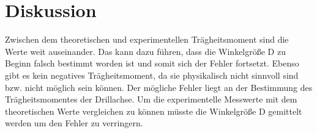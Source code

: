 \section{Diskussion}
Zwischen dem theoretischen und experimentellen Trägheitsmoment sind die Werte weit auseinander. Das kann dazu führen, dass die Winkelgröße D zu Beginn falsch bestimmt worden ist und somit sich der Fehler fortsetzt.
Ebenso gibt es kein negatives Trägheitsmoment, da sie physikalisch nicht sinnvoll sind bzw. nicht möglich sein können. Der mögliche Fehler liegt an der Bestimmung des Trägheitsmomentes der Drillachse.
Um die experimentelle Messwerte mit dem theoretischen Werte vergleichen zu können müsste die
Winkelgröße D  gemittelt werden um den Fehler zu verringern.

